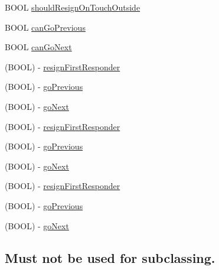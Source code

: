  \begin{DoxyCompactItemize}
\item 
B\+O\+OL \mbox{\hyperlink{interface_i_q_keyboard_manager_abb8de02f0e363cc77f87cabe3f85753b}{should\+Resign\+On\+Touch\+Outside}}
\item 
B\+O\+OL \mbox{\hyperlink{interface_i_q_keyboard_manager_a70c77d534028b7ce81280f4a66dedb04}{can\+Go\+Previous}}
\item 
B\+O\+OL \mbox{\hyperlink{interface_i_q_keyboard_manager_a895d5e9d300379e6ac7be4a6ab7ab63c}{can\+Go\+Next}}
\item 
(B\+O\+OL) -\/ \mbox{\hyperlink{interface_i_q_keyboard_manager_accb0b24e40de4e66aa45833bdcae5cb9}{resign\+First\+Responder}}
\item 
(B\+O\+OL) -\/ \mbox{\hyperlink{interface_i_q_keyboard_manager_a7180029406d314ec870a427657397f61}{go\+Previous}}
\item 
(B\+O\+OL) -\/ \mbox{\hyperlink{interface_i_q_keyboard_manager_a099ee16abf2cfa1077faf4de6a86e649}{go\+Next}}
\item 
(B\+O\+OL) -\/ \mbox{\hyperlink{interface_i_q_keyboard_manager_accb0b24e40de4e66aa45833bdcae5cb9}{resign\+First\+Responder}}
\item 
(B\+O\+OL) -\/ \mbox{\hyperlink{interface_i_q_keyboard_manager_a7180029406d314ec870a427657397f61}{go\+Previous}}
\item 
(B\+O\+OL) -\/ \mbox{\hyperlink{interface_i_q_keyboard_manager_a099ee16abf2cfa1077faf4de6a86e649}{go\+Next}}
\item 
(B\+O\+OL) -\/ \mbox{\hyperlink{interface_i_q_keyboard_manager_accb0b24e40de4e66aa45833bdcae5cb9}{resign\+First\+Responder}}
\item 
(B\+O\+OL) -\/ \mbox{\hyperlink{interface_i_q_keyboard_manager_a7180029406d314ec870a427657397f61}{go\+Previous}}
\item 
(B\+O\+OL) -\/ \mbox{\hyperlink{interface_i_q_keyboard_manager_a099ee16abf2cfa1077faf4de6a86e649}{go\+Next}}
\end{DoxyCompactItemize}
\subsection*{Must not be used for subclassing.}
\label{_amgrp014299382984a0f9448edde258cc0e34}%


 

